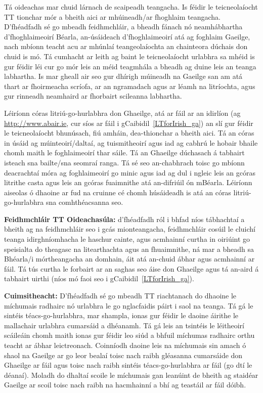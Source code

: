 \begin{multicols}{2}
Tá oideachas mar chuid lárnach de scaipeadh teangacha. Is féidir le teicneolaíocht TT tionchar mór a bheith aici ar mhúineadh/ar fhoghlaim teangacha. D’fhéadfadh sé go mbeadh feidhmchláir, a bheadh fánach nó neamhábhartha d’fhoghlaimeoirí Béarla, an-úsáideach d’fhoghlaimeoirí atá ag foghlaim Gaeilge, nach mbíonn teacht acu ar mhúnlaí teangeolaíochta an chainteora dúchais don chuid is mó. Tá cumhacht ar leith ag baint le teicneolaíocht urlabhra sa mhéid is gur féidir léi cur go mór leis an méid teagmhála a bheadh ag duine leis an teanga labhartha. Is mar gheall air seo gur dhírigh múineadh na Gaeilge san am atá thart ar fhoirmeacha scríofa, ar an ngramadach agus ar léamh na litríochta, agus gur rinneadh neamhaird ar fhorbairt scileanna labhartha.

Léiríonn córas litriú-go-hurlabhra don Ghaeilge, atá ar fáil ar an idirlíon (ag \url{http://www.abair.ie}, cur síos ar fáil i gCaibidil~\ref{LTforIrish_ga}) an slí gur féidir le teicneolaíocht bhunúsach, fiú amháin, dea-thionchar a bheith aici. Tá an córas in úsáid ag múinteoirí/daltaí, ag tuismitheoirí agus iad ag cabhrú le hobair bhaile chomh maith le foghlaimeoirí thar sáile. Tá an Ghaeilge dúchasach á tabhairt isteach sna bailte/sna seomraí ranga. Tá sé seo an-chabhrach toisc go mbíonn deacrachtaí móra ag foghlaimeoirí go minic agus iad ag dul i ngleic leis an gcóras litrithe casta agus leis an gcóras fuaimnithe atá an-difriúil ón mBéarla. Léiríonn aiseolas ó dhaoine ar fud na cruinne cé chomh húsáideadh is atá an córas litriú-go-hurlabhra sna comhthéacsanna seo.

\textbf{Feidhmchláir TT Oideachasúla:} d’fhéadfadh ról i bhfad níos tábhachtaí a bheith ag na feidhmchláir seo i gcás mionteangacha, feidhmchláir cosúil le cluichí teanga idirghníomhacha le haschur cainte, agus acmhainní curtha in oiriúint go speisialta do theagasc na litearthachta agus an fhuaimnithe, ná mar a bheadh sa Bhéarla/i mórtheangacha an domhain, áit atá an-chuid ábhar agus acmhainní ar fáil. Tá tús curtha le forbairt ar an saghas seo áise don Ghaeilge agus tá an-aird á tabhairt uirthi (níos mó faoi seo i gCaibidil~\ref{LTforIrish_ga}).

\textbf{Cuimsitheacht:} D’fhéadfadh sé go mbeadh TT riachtanach do dhaoine le míchumais radhairc nó urlabhra le go nglacfaidis páirt i saol na teanga. Tá gá le sintéis téacs-go-hurlabhra, mar shampla, ionas gur féidir le daoine áirithe le mallachair urlabhra cumarsáid a dhéanamh. Tá gá leis an tsintéis le léitheoirí scáileáin chomh maith ionas gur féidir leo siúd a bhfuil míchumas radhairc orthu teacht ar ábhar leictreonach. Coinníodh daoine leis na míchumais sin amach ó shaol na Gaeilge ar go leor bealaí toisc nach raibh gléasanna cumarsáide don Ghaeilge ar fáil agus toisc nach raibh sintéis téacs-go-hurlabhra ar fáil (go dtí le déanaí). Moladh do dhaltaí scoile le míchumais gan leanúint de bheith ag staidéar Gaeilge ar scoil toisc nach raibh na hacmhainní a bhí ag teastáil ar fáil dóibh.


\end{multicols}
